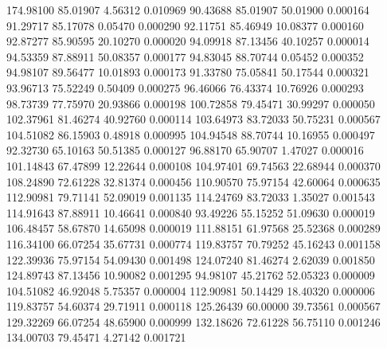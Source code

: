       174.98100       85.01907        4.56312       0.010969
       90.43688       85.01907       50.01900       0.000164
       91.29717       85.17078        0.05470       0.000290
       92.11751       85.46949       10.08377       0.000160
       92.87277       85.90595       20.10270       0.000020
       94.09918       87.13456       40.10257       0.000014
       94.53359       87.88911       50.08357       0.000177
       94.83045       88.70744        0.05452       0.000352
       94.98107       89.56477       10.01893       0.000173
       91.33780       75.05841       50.17544       0.000321
       93.96713       75.52249        0.50409       0.000275
       96.46066       76.43374       10.76926       0.000293
       98.73739       77.75970       20.93866       0.000198
      100.72858       79.45471       30.99297       0.000050
      102.37961       81.46274       40.92760       0.000114
      103.64973       83.72033       50.75231       0.000567
      104.51082       86.15903        0.48918       0.000995
      104.94548       88.70744       10.16955       0.000497
       92.32730       65.10163       50.51385       0.000127
       96.88170       65.90707        1.47027       0.000016
      101.14843       67.47899       12.22644       0.000108
      104.97401       69.74563       22.68944       0.000370
      108.24890       72.61228       32.81374       0.000456
      110.90570       75.97154       42.60064       0.000635
      112.90981       79.71141       52.09019       0.001135
      114.24769       83.72033        1.35027       0.001543
      114.91643       87.88911       10.46641       0.000840
       93.49226       55.15252       51.09630       0.000019
      106.48457       58.67870       14.65098       0.000019
      111.88151       61.97568       25.52368       0.000289
      116.34100       66.07254       35.67731       0.000774
      119.83757       70.79252       45.16243       0.001158
      122.39936       75.97154       54.09430       0.001498
      124.07240       81.46274        2.62039       0.001850
      124.89743       87.13456       10.90082       0.001295
       94.98107       45.21762       52.05323       0.000009
      104.51082       46.92048        5.75357       0.000004
      112.90981       50.14429       18.40320       0.000006
      119.83757       54.60374       29.71911       0.000118
      125.26439       60.00000       39.73561       0.000567
      129.32269       66.07254       48.65900       0.000999
      132.18626       72.61228       56.75110       0.001246
      134.00703       79.45471        4.27142       0.001721
